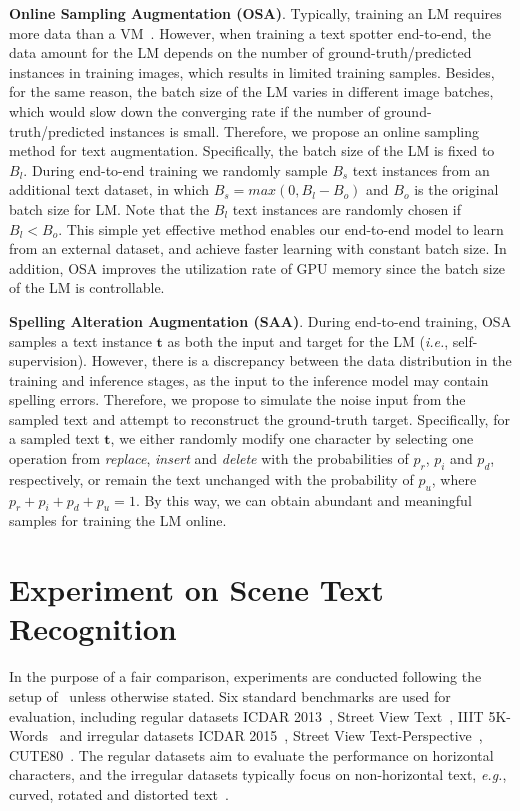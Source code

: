 \documentclass[10pt,journal,compsoc]{IEEEtran}
\def\ie{{\it i.e.}\xspace}
\def\eg{{\it e.g.}\xspace}
\begin{document}
\indent\textbf{Online Sampling Augmentation (OSA)}. Typically, training an LM requires more data than a VM~\cite{radford2018improving,qin2019towards}. However, when training a text spotter end-to-end, the data amount for the LM depends on the number of ground-truth/predicted instances in training images, which results in limited training samples. Besides, for the same reason, the batch size of the LM varies in different image batches, which would slow down the converging rate if the number of ground-truth/predicted instances is small. Therefore, we propose an online sampling method for text augmentation. Specifically, the batch size of the LM is fixed to $B_l$. During end-to-end training we randomly sample $B_s$ text instances from an additional text dataset, in which $B_s = max(0, B_l-B_o)$ and $B_o$ is the original batch size for LM. Note that the $B_l$ text instances are randomly chosen if $B_l < B_o$. This simple yet effective method enables our end-to-end model to learn from an external dataset, and achieve faster learning with constant batch size. In addition, OSA improves the utilization rate of GPU memory since the batch size of the LM is controllable.


\indent\textbf{Spelling Alteration Augmentation (SAA)}. During end-to-end training, OSA samples a text instance $\mathbf{t}$ as both the input and target for the LM (\ie, self-supervision). However, there is a discrepancy between the data distribution in the training and inference stages, as the input to the inference model may contain spelling errors. Therefore, we propose to simulate the noise input from the sampled text and attempt to reconstruct the ground-truth target. Specifically, for a sampled text $\mathbf{t}$, we either randomly modify one character by selecting one operation from \emph{replace}, \emph{insert} and \emph{delete} with the probabilities of $p_r$, $p_i$ and $p_d$, respectively, or remain the text unchanged with the probability of $p_u$, where $p_r + p_i + p_d + p_u = 1$. By this way, we can obtain abundant and meaningful samples for training the LM online.





\section{Experiment on Scene Text Recognition}
\label{sec:exp}

In the purpose of a fair comparison, experiments are conducted following the setup of~\cite{yu2020towards} unless otherwise stated. Six standard benchmarks are used for evaluation, including regular datasets ICDAR 2013~\cite{karatzas2013icdar}, Street View Text~\cite{wang2011end}, IIIT 5K-Words~\cite{mishra2012scene} and irregular datasets ICDAR 2015~\cite{karatzas2015icdar}, Street View Text-Perspective~\cite{quy2013recognizing}, CUTE80~\cite{risnumawan2014robust}. The regular datasets aim to evaluate the performance on horizontal characters, and the irregular datasets typically focus on non-horizontal text, \eg, curved, rotated and distorted text~\cite{baek2019wrong}.
\end{document}
